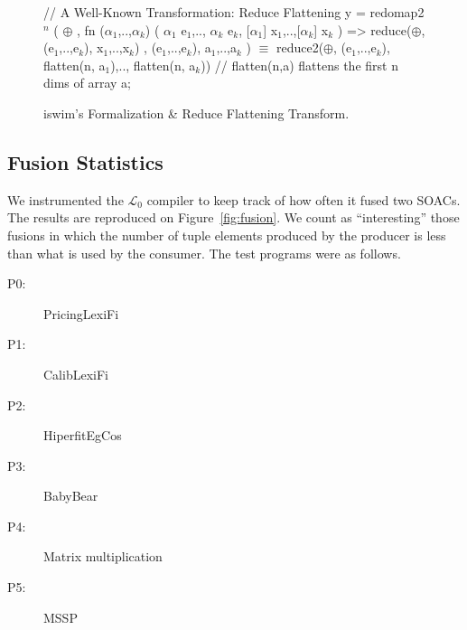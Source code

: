 \documentclass{sigplanconf}  %
\newcommand{\emp}[1]{\textcolor{DikuRed}{ #1}}
\newcommand{\emphh}[1]{\textcolor{CosGreen}{ #1}}
\newcommand{\mymath}[1]{$ #1 $}
\newcommand{\myindx}[1]{_{#1}}
\newcommand{\myindu}[1]{^{#1}}
\newcommand{\LO}{$\mathcal{L}_0$}
\begin{document}
\begin{figure}[bt]
{\begin{colorcode}
// \emp{A Well-Known Transformation: Reduce Flattening}
y = redomap2\mymath{\myindu{n}} ( \mymath{\oplus} 
               , fn (\mymath{\alpha\myindx{1}},..,\mymath{\alpha\myindx{k}}) ( \mymath{\alpha\myindx{1}} e\mymath{\myindx{1}},..,  \mymath{\alpha\myindx{k}} e\mymath{\myindx{k}},
                                [\mymath{\alpha\myindx{1}}] x\mymath{\myindx{1}},..,[\mymath{\alpha\myindx{k}}] x\mymath{\myindx{k}} ) => 
                     reduce(\mymath{\oplus}, (e\mymath{\myindx{1}},..,e\mymath{\myindx{k}}), x\mymath{\myindx{1}},..,x\mymath{\myindx{k}})
               , (e\mymath{\myindx{1}},..,e\mymath{\myindx{k}}), a\mymath{\myindx{1}},..,a\mymath{\myindx{k}} )
        \emphh{\mymath{\equiv}}
reduce2(\mymath{\oplus}, (e\mymath{\myindx{1}},..,e\mymath{\myindx{k}}), flatten(n, a\mymath{\myindx{1}}),.., flatten(n, a\mymath{\myindx{k}}))
// flatten(n,a) flattens the first n dims of array a;
\end{colorcode}
} \vspace{-2ex}
\caption{{\sc iswim}'s Formalization \& Reduce Flattening Transform.}
\label{fig:TransfGen}
\end{figure}






\subsection{Fusion Statistics}
\label{sec:results}

We instrumented the \LO{} compiler to keep track of how often it fused
two SOACs.  The results are reproduced on Figure~\ref{fig:fusion}.  We
count as ``interesting'' those fusions in which the number of tuple
elements produced by the producer is less than what is used by the
consumer.  The test programs were as follows.

\begin{description}
\item[P0:] PricingLexiFi
\item[P1:] CalibLexiFi
\item[P2:] HiperfitEgCos
\item[P3:] BabyBear
\item[P4:] Matrix multiplication
\item[P5:] MSSP
\end{description}
\end{document}
